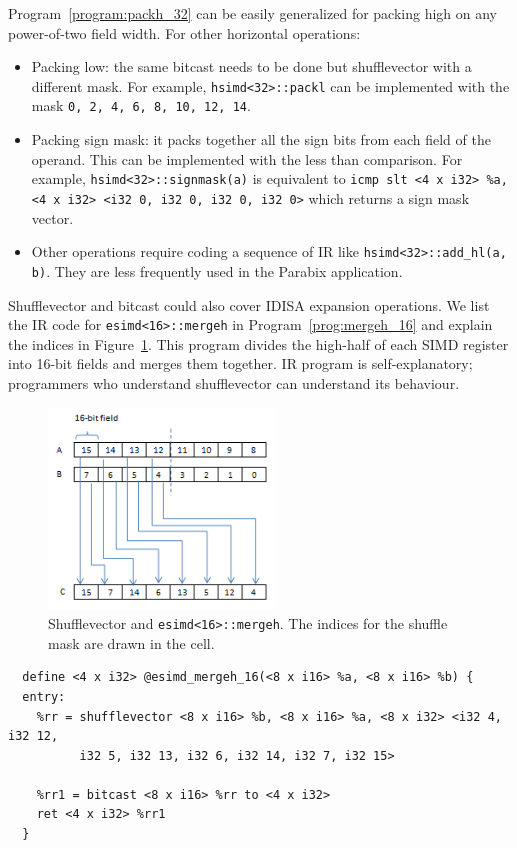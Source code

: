 Program~\ref{program:packh_32} can be easily generalized for packing high on any power-of-two field width. For other horizontal operations:
\begin{itemize}
    \item Packing low: the same bitcast needs to be done but shufflevector with a different mask. For example, {\tt hsimd<32>::packl} can be implemented with the mask {\tt 0, 2, 4, 6, 8, 10, 12, 14}.
    \item Packing sign mask: it packs together all the sign bits from each field of the operand. This can be implemented with the less than comparison. For example, {\tt hsimd<32>::signmask(a)} is equivalent to \verb|icmp slt <4 x i32> %a, <4 x i32> <i32 0, i32 0, i32 0, i32 0>| which returns a {\tt <4 x i1>} sign mask vector.
    \item Other operations require coding a sequence of IR like {\tt hsimd<32>::add\_hl(a, b)}. They are less frequently used in the Parabix application.
\end{itemize}

Shufflevector and bitcast could also cover IDISA expansion operations. We list the IR code for {\tt esimd<16>::mergeh} in Program~\ref{prog:mergeh_16} and explain the indices in Figure~\ref{fig:mergeh_16}. This program divides the high-half of each SIMD register into 16-bit fields and merges them together. IR program is self-explanatory; programmers who understand shufflevector can understand its behaviour.

\begin{figure}[ht!]
\centering
\includegraphics[width=60mm]{draw/mergeh_16.png}
\caption[Implement {\tt esimd<16>::mergeh} with shufflevector]{Shufflevector and {\tt esimd<16>::mergeh}. The indices for the shuffle mask are drawn in the cell.}
\label{fig:mergeh_16}
\end{figure}

\begin{program}
\begin{verbatim}
  define <4 x i32> @esimd_mergeh_16(<8 x i16> %a, <8 x i16> %b) {
  entry:
    %rr = shufflevector <8 x i16> %b, <8 x i16> %a, <8 x i32> <i32 4, i32 12,
          i32 5, i32 13, i32 6, i32 14, i32 7, i32 15>

    %rr1 = bitcast <8 x i16> %rr to <4 x i32>
    ret <4 x i32> %rr1
  }
\end{verbatim}
\caption[Shufflevector implementation of mergeh.]{Shufflevector and {\tt esimd<16>::mergeh} in LLVM IR\@. Expansion operations double the width of fields.}
\label{prog:mergeh_16}
\end{program}

